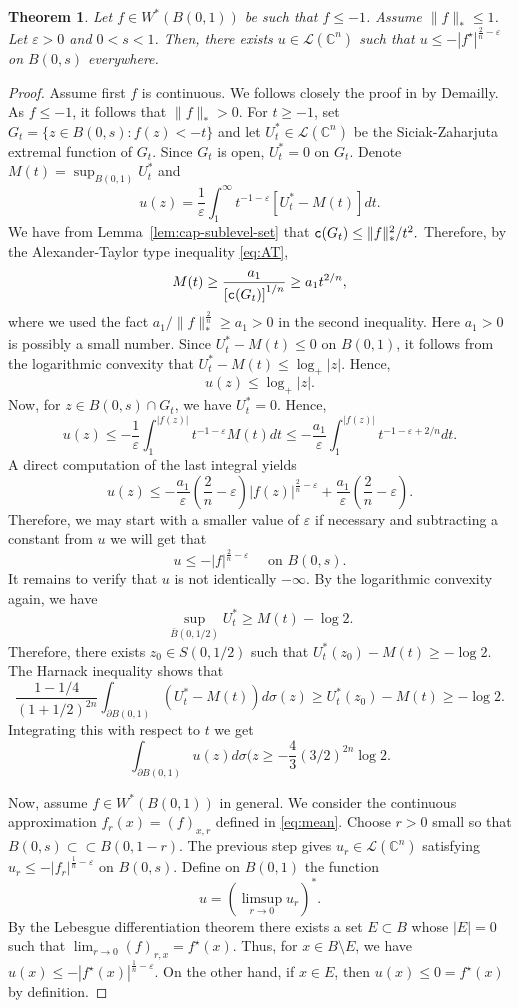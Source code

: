 \documentclass{amsart}
\renewcommand{\d}{\partial}
\newcommand{\veps}{\varepsilon}
\newcommand{\sig}{\sigma}
\newcommand{\tc}{{\tt c}}
\newcommand{\cL}{\mathcal{L}}
\newcommand{\bC}{\mathbb{C}}
\newcommand{\cali}[1]{\mathscr{#1}}
\newcommand{\Lc}{\cali{L}}
\newtheorem{thm}{Theorem}
\theoremstyle{definition}
\numberwithin{thm}{section}
\numberwithin{equation}{section}
\renewcommand{\[}{\begin{equation}}
\renewcommand{\]}{\end{equation}}
\begin{document}
\begin{thm} \label{thm:subextension} 
Let $f \in W^*(B(0,1))$ be such that $f\leq -1$. Assume $\|f\|_*\leq 1$. Let $\veps>0$  and $0<s<1$. Then, there exists $u \in \cL(\bC^n)$ such that $u\leq -|f^\star|^{\frac{2}{n}-\veps}$ on $B(0,s)$ everywhere.
\end{thm}
\begin{proof} Assume first $f$ is continuous. We follows closely  the proof in \cite[Theorem~11.4]{De89} by Demailly.  
As $f\leq -1$, it follows that $\|f\|_*>0$. For $t\geq -1$, set $G_t = \{z\in B(0,s): f(z) <-t\}$ and let  $U_t^* \in\Lc(\bC^n)$ be the Siciak-Zaharjuta extremal function of $G_t$. Since $G_t$ is open, $U_t^* =0$ on $G_t$. Denote $M(t) = \sup_{B(0,1)} U_t^*$ and 
$$
	u(z) = \frac{1}{\veps} \int_1^\infty t^{-1-\veps} \left[U_t^* - M(t)\right] dt.
$$
We have from Lemma~\ref{lem:cap-sublevel-set} that
$
	\tc (G_t) \leq \|f\|_*^2/t^2.
$
Therefore, by the Alexander-Taylor type inequality \eqref{eq:AT},
$$
	M(t) \geq \frac{a_1}{\left[\tc (G_t)\right]^{1/n}} \geq a_1t^{2/n},
$$
where we used the fact $a_1/\|f\|_*^\frac{2}{n} \geq a_1>0$ in the second inequality. Here $a_1>0$ is possibly a small number.  Since $U_t^* - M(t) \leq 0$ on $B(0,1)$,  it follows from the logarithmic convexity that 
$U_t^* - M(t) \leq \log_+|z|$. Hence, 
$$
	u(z) \leq \log_+|z|.
$$
Now, for $z\in B(0,s) \cap G_t$, we have $U_t^*=0$. Hence,
$$
	u(z) \leq - \frac{1}{\veps} \int_1^{|f(z)|} t^{-1-\veps} M(t) dt \leq - \frac{a_1}{\veps} \int_1^{|f(z)|} t^{-1-\veps+2/n} dt. 
$$
A direct computation of the last integral yields
$$
	u(z) \leq -\frac{a_1}{\veps} \left(\frac{2}{n} -\veps \right) |f(z)|^{\frac{2}{n}-\veps} + \frac{a_1}{\veps} \left(\frac{2}{n} -\veps\right).
$$
Therefore, we may start with a smaller value of $\veps$ if necessary and subtracting a constant from  $u$ we will get that
$$
	u \leq -|f|^{\frac{2}{n} -\veps} \quad\text{ on } B(0,s).
$$
It remains to verify that $u$ is not identically $-\infty$. By the logarithmic convexity again, we have
$$
	\sup_{\bar B(0,1/2)} U_t^* \geq M(t) - \log 2.
$$
Therefore, there exists $z_0\in S(0,1/2)$ such that $U_t^*(z_0) - M(t) \geq -\log 2$. The Harnack inequality shows that
$$
	\frac{1-1/4}{(1+1/2)^{2n}} \int_{\d B(0,1)} (U_t^* - M(t)) d\sig(z) \geq U_t^*(z_0) - M(t) \geq -\log 2.
$$
Integrating this with respect to $t$ we get
$$
	\int_{\d B(0,1)} u(z) d\sig(z \geq -\frac{4}{3} (3/2)^{2n} \log 2.
$$

Now, assume $f \in W^*(B(0,1))$ in general. We consider the continuous approximation $f_r(x) =(f)_{x,r}$ defined in \eqref{eq:mean}. Choose $r>0$ small so that $B(0,s) \subset \subset B(0,1-r)$. The previous step gives  $u_r \in \Lc(\bC^n)$ satisfying  $u_r \leq - |f_r|^{\frac{1}{n} -\veps}$ on $B(0,s)$.
Define on $B(0,1)$ the function
$$
	u = \left(\limsup_{r\to 0} u_r \right)^*.
$$
By the Lebesgue differentiation theorem there exists a set $E\subset B$ whose $|E| =0$ such that $\lim_{r\to 0} (f)_{r,x} = f^\star(x)$. Thus,  for $x\in B\setminus E$, we have $u (x)  \leq - |f^\star (x)|^{\frac{1}{n}-\veps}.$ On the other hand,  if $x\in E$, then $u(x) \leq 0 = f^\star(x)$ by definition.
\end{proof}
\end{document}
